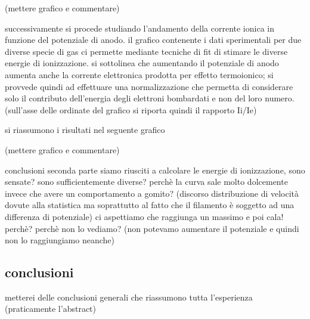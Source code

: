 \documentclass[11pt,a4paper]{article}
\begin{document}
(mettere grafico e commentare)

successivamente si procede studiando l'andamento della corrente ionica in funzione del potenziale di anodo. il grafico contenente i dati sperimentali per due diverse specie di gas ci permette mediante tecniche di fit di stimare le diverse energie di ionizzazione.
si sottolinea che aumentando il potenziale di anodo aumenta anche la corrente elettronica prodotta per effetto termoionico; si provvede quindi ad effettuare una normalizzazione che permetta di considerare solo il contributo dell'energia degli elettroni bombardati e non del loro numero. (sull'asse delle ordinate del grafico si riporta quindi il rapporto Ii/Ie)

si riassumono i risultati nel seguente grafico

(mettere grafico e commentare)

conclusioni seconda parte
siamo riusciti a calcolare le energie di ionizzazione, sono sensate? sono sufficientemente diverse?
perchè la curva sale molto dolcemente invece che avere un comportamento a gomito? (discorso distribuzione di velocità dovute alla statistica ma soprattutto al fatto che il filamento è soggetto ad una differenza di potenziale) 
ci aspettiamo che raggiunga un massimo e poi cala! perchè? perchè non lo vediamo? (non potevamo aumentare il potenziale e quindi non lo raggiungiamo neanche)

\subsection{conclusioni}
metterei delle conclusioni generali che riassumono tutta l'esperienza (praticamente l'abstract)
\end{document}
